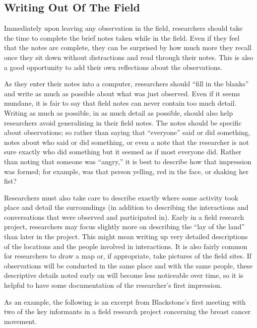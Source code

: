 \subsection{Writing Out Of The Field}

Immediately upon leaving any observation in the field, researchers should take the time to complete the brief notes taken while in the field. Even if they feel that the notes are complete, they can be surprised by how much more they recall once they sit down without distractions and read through their notes. This is also a good opportunity to add their own reflections about the observations.

As they enter their notes into a computer, researchers should ``fill in the blanks'' and write as much as possible about what was just observed. Even if it seems mundane, it is fair to say that field notes can never contain too much detail. Writing as much as possible, in as much detail as possible, should also help researchers avoid generalizing in their field notes. The notes should be specific about observations; so rather than saying that ``everyone'' said or did something, notes about who said or did something, or even a note that the researcher is not sure exactly who did something but it seemed as if most everyone did. Rather than noting that someone was ``angry,'' it is best to describe how that impression was formed; for example, was that person yelling, red in the face, or shaking her fist?

Researchers must also take care to describe exactly where some activity took place and detail the surroundings (in addition to describing the interactions and conversations that were observed and participated in). Early in a field research project, researchers may focus slightly more on describing the ``lay of the land'' than later in the project. This might mean writing up very detailed descriptions of the locations and the people involved in interactions. It is also fairly common for researchers to draw a map or, if appropriate, take pictures of the field sites. If observations will be conducted in the same place and with the same people, these descriptive details noted early on will become less noticeable over time, so it is helpful to have some documentation of the researcher's first impression. 

As an example, the following is an excerpt from Blackstone's first meeting with two of the key informants in a field research project concerning the breast cancer movement\cite{blackstone2012principles}.

